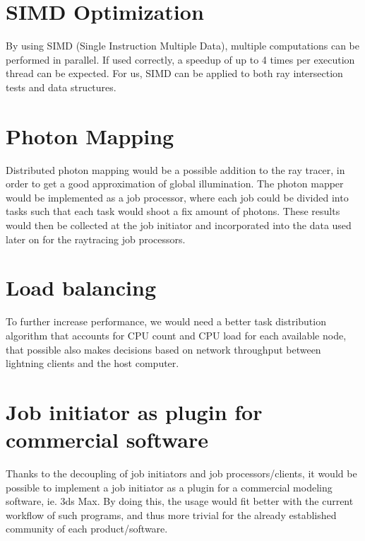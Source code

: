 \section{SIMD Optimization}
By using SIMD (Single Instruction Multiple Data), multiple computations can be performed in parallel. If used correctly, a speedup of up to 4 times per execution thread can be expected. For us, SIMD can be applied to both ray intersection tests and data structures.


\section{Photon Mapping}
Distributed photon mapping would be a possible addition to the ray tracer, in order to get a good approximation of global illumination. The photon mapper would be implemented as a job processor, where each job could be divided into tasks such that each task would shoot a fix amount of photons. These results would then be collected at the job initiator and incorporated into the data used later on for the raytracing job processors. 

\section{Load balancing}
To further increase performance, we would need a better task distribution algorithm that accounts for CPU count and CPU load for each available node, that possible also makes decisions based on network throughput between lightning clients and the host computer.

\section{Job initiator as plugin for commercial software}
Thanks to the decoupling of job initiators and job processors/clients, it would be possible to implement a job initiator as a plugin for a commercial modeling software, ie. 3ds Max. By doing this, the usage would fit better with the current workflow of such programs, and thus more trivial for the already established community of each product/software.

